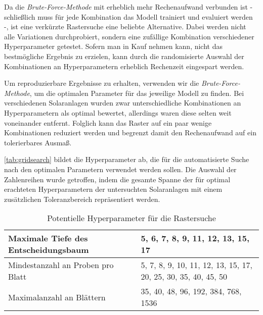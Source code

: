 \documentclass[12pt, a4paper]{article}
\begin{document}
Da die \textit{Brute-Force-Methode} mit erheblich mehr Rechenaufwand verbunden ist - schließlich muss für jede Kombination das Modell trainiert und evaluiert werden -, ist eine verkürzte Rastersuche eine beliebte Alternative. Dabei werden nicht alle Variationen durchprobiert, sondern eine zufällige Kombination verschiedener Hyperparameter getestet. Sofern man in Kauf nehmen kann, nicht das bestmögliche Ergebnis zu erzielen, kann durch die randomisierte Auswahl der Kombinationen an Hyperparametern erheblich Rechenzeit eingespart werden.

Um reproduzierbare Ergebnisse zu erhalten, verwenden wir die \textit{Brute-Force-Methode}, um die optimalen Parameter für das jeweilige Modell zu finden. Bei verschiedenen Solaranlagen wurden zwar unterschiedliche Kombinationen an Hyperparametern als optimal bewertet, allerdings waren diese selten weit voneinander entfernt. Folglich kann das Raster auf ein paar wenige Kombinationen reduziert werden und begrenzt damit den Rechenaufwand auf ein tolerierbares Ausmaß.

\autoref{tab:gridsearch} bildet die Hyperparameter ab, die für die automatisierte Suche nach den optimalen Parametern verwendet werden sollen. Die Auswahl der Zahlenreihen wurde getroffen, indem die gesamte Spanne der für optimal erachteten Hyperparametern der untersuchten Solaranlagen mit einem zusätzlichen Toleranzbereich repräsentiert werden. 

\begin{table}[H]
\begin{center}

\begin{tabular}{| p{4cm} | p{8cm} |}

\hline
Maximale Tiefe des Entscheidungsbaum & 5, 6, 7, 8, 9, 11, 12, 13, 15, 17 \\ \hline
Mindestanzahl an \newline Proben pro Blatt & 5, 7, 8, 9, 10, 11, 12, 13, 15, 17, 20, 25, 30, 35, 40, 45, 50 \\ \hline
Maximalanzahl \newline an Blättern & 35, 40, 48, 96, 192, 384, 768, 1536 \\ \hline

\end{tabular}
\end{center}

\caption{Potentielle Hyperparameter für die Rastersuche}
\label{tab:gridsearch}
\end{table}
\end{document}
